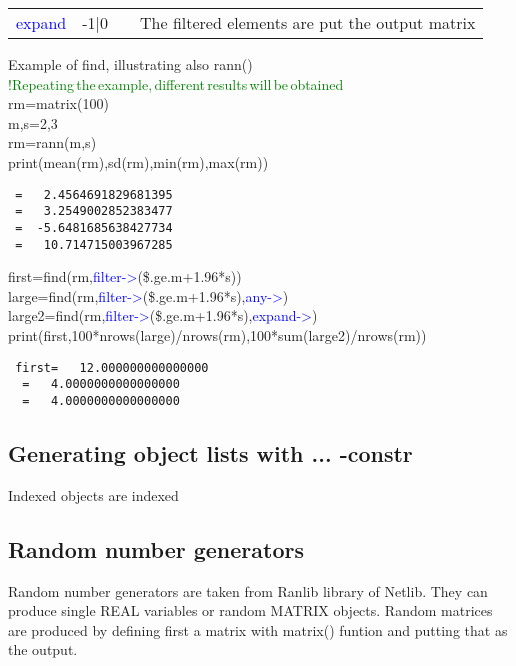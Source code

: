 \vspace{-1.51em}
\begin{table}[H]
\begin{tabular}{ m{}  m{}m{}p{}}
\textcolor{blue}{expand}&-1|0&& The filtered elements are put the output matrix
\\ \cline{1-4}
\end{tabular}
\end{table}
\begin{example}[findex]Example of find, illustrating also \textcolor{VioletRed}{rann}()\\
\label{findex}
\textcolor{green}{!Repeating\,the\,example,\,different\,results\,will\,be\,obtained}\\
 rm=\textcolor{VioletRed}{matrix}(100)\\
 m,s=2,3\\
 rm=\textcolor{VioletRed}{rann}(m,s)\\
 \textcolor{VioletRed}{print}(\textcolor{VioletRed}{mean}(rm),\textcolor{VioletRed}{sd}(rm),\textcolor{VioletRed}{min}(rm),\textcolor{VioletRed}{max}(rm))
\color{Green}
\begin{verbatim}
 =   2.4564691829681395
 =   3.2549002852383477
 =  -5.6481685638427734
 =   10.714715003967285
\end{verbatim}
\color{Black}
 first=\textcolor{VioletRed}{find}(rm,\textcolor{blue}{filter->}(\$.ge.m+1.96*s))\\
 large=\textcolor{VioletRed}{find}(rm,\textcolor{blue}{filter->}(\$.ge.m+1.96*s),\textcolor{blue}{any->})\\
 large2=\textcolor{VioletRed}{find}(rm,\textcolor{blue}{filter->}(\$.ge.m+1.96*s),\textcolor{blue}{expand->})\\
 \textcolor{VioletRed}{print}(first,100*nrows(large)/\textcolor{VioletRed}{nrows}(rm),100*sum(large2)/\textcolor{VioletRed}{nrows}(rm))
\color{Green}
\begin{verbatim}
 first=   12.000000000000000
  =   4.0000000000000000
  =   4.0000000000000000
\end{verbatim}
\color{Black}
\end{example}
\subsection{Generating object lists with ... -constr}
\label{dots}
Indexed objects are indexed

\subsection{Random number generators}
\label{random}
Random number generators are taken from Ranlib library of Netlib.
They can produce single REAL variables or random MATRIX objects.
Random matrices are produced by defining first a matrix with \textcolor{VioletRed}{matrix}()
funtion and putting that as the output.
